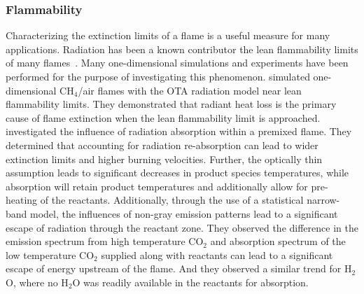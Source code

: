 \subsubsection{Flammability}
Characterizing the extinction limits of a flame is a useful measure for many applications. Radiation has been a known contributor the lean flammability limits of many flames~\cite{Ju2000AsymptoticFlames,Liu2020TheFlames}.
Many one-dimensional simulations and experiments have been performed for the purpose of investigating this phenomenon.
\citet{Lakshmisha1991OnChemistry} simulated one-dimensional CH$_4$/air flames with the OTA radiation model near lean flammability limits. They demonstrated that radiant heat loss is the primary cause of flame extinction when the lean flammability limit is approached.
\citet{Ju1998EffectsFlames} investigated the influence of radiation absorption within a premixed flame.
They determined that accounting for radiation re-absorption can lead to wider extinction limits and higher burning velocities. Further, the optically thin assumption leads to significant decreases in product species temperatures, while absorption will retain product temperatures and additionally allow for pre-heating of the reactants.
Additionally, through the use of a statistical narrow-band model, the influences of non-gray emission patterns lead to a significant escape of radiation through the reactant zone. They observed the difference in the emission spectrum from high temperature CO$_2$ and absorption spectrum of the low temperature CO$_2$ supplied along with reactants can lead to a significant escape of energy upstream of the flame. And they observed a similar trend for H$_2$O, where no H$_2$O was readily available in the reactants for absorption.

